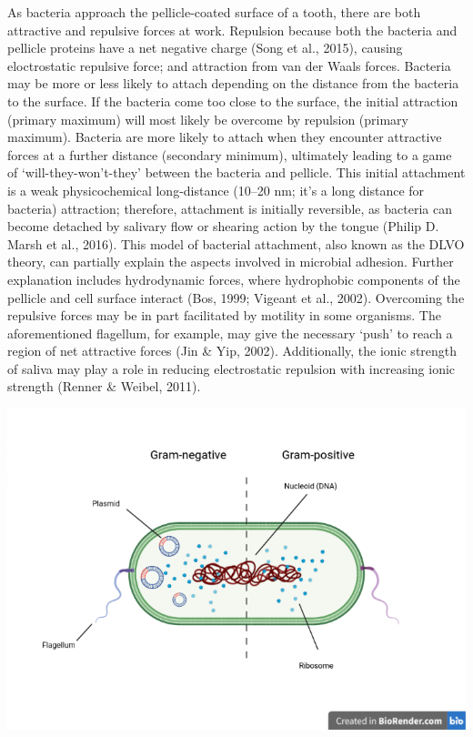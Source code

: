 \documentclass[
  letterpaper,
]{book}
\begin{document}
As bacteria approach the pellicle-coated surface of a tooth, there are
both attractive and repulsive forces at work. Repulsion because both the
bacteria and pellicle proteins have a net negative charge (Song et al.,
2015), causing eloctrostatic repulsive force; and attraction from van
der Waals forces. Bacteria may be more or less likely to attach
depending on the distance from the bacteria to the surface. If the
bacteria come too close to the surface, the initial attraction (primary
maximum) will most likely be overcome by repulsion (primary maximum).
Bacteria are more likely to attach when they encounter attractive forces
at a further distance (secondary minimum), ultimately leading to a game
of `will-they-won't-they' between the bacteria and pellicle. This
initial attachment is a weak physicochemical long-distance (10--20 nm;
it's a long distance for bacteria) attraction; therefore, attachment is
initially reversible, as bacteria can become detached by salivary flow
or shearing action by the tongue (Philip D. Marsh et al., 2016). This
model of bacterial attachment, also known as the DLVO theory, can
partially explain the aspects involved in microbial adhesion. Further
explanation includes hydrodynamic forces, where hydrophobic components
of the pellicle and cell surface interact (Bos, 1999; Vigeant et al.,
2002). Overcoming the repulsive forces may be in part facilitated by
motility in some organisms. The aforementioned flagellum, for example,
may give the necessary `push' to reach a region of net attractive forces
(Jin \& Yip, 2002). Additionally, the ionic strength of saliva may play
a role in reducing electrostatic repulsion with increasing ionic
strength (Renner \& Weibel, 2011).

\includegraphics{figures/bacterial-structure.png}
\end{document}
